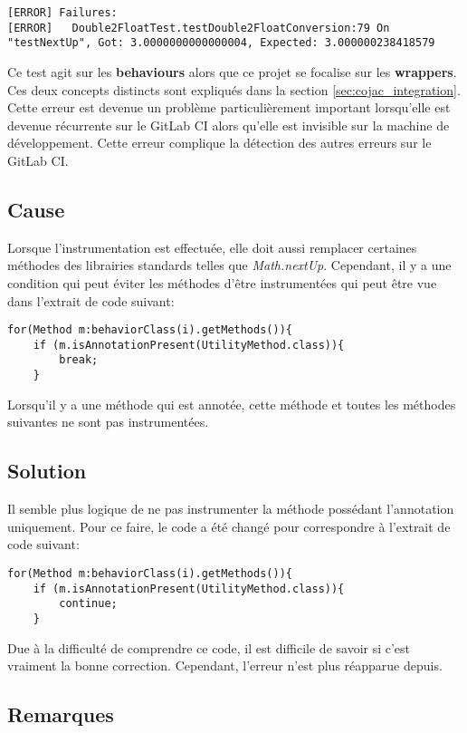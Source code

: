 \begin{verbatim}
[ERROR] Failures: 
[ERROR]   Double2FloatTest.testDouble2FloatConversion:79 On "testNextUp", Got: 3.0000000000000004, Expected: 3.000000238418579
\end{verbatim}

Ce test agit sur les \textbf{behaviours} alors que ce projet se focalise sur les \textbf{wrappers}. Ces deux concepts distincts sont expliqués dans la section \ref{sec:cojac_integration}. Cette erreur est devenue un problème particulièrement important lorsqu'elle est devenue récurrente sur le GitLab CI alors qu'elle est invisible sur la machine de développement. Cette erreur complique la détection des autres erreurs sur le GitLab CI.

\subsection{Cause}

Lorsque l'instrumentation est effectuée, elle doit aussi remplacer certaines méthodes des librairies standards telles que \textit{Math.nextUp}. Cependant, il y a une condition qui peut éviter les méthodes d'être instrumentées qui peut être vue dans l'extrait de code suivant:
\begin{verbatim}
for(Method m:behaviorClass(i).getMethods()){
    if (m.isAnnotationPresent(UtilityMethod.class)){
        break;
    }
\end{verbatim}
Lorsqu'il y a une méthode qui est annotée, cette méthode et toutes les méthodes suivantes ne sont pas instrumentées.

\subsection{Solution}

Il semble plus logique de ne pas instrumenter la méthode possédant l'annotation uniquement. Pour ce faire, le code a été changé pour correspondre à l'extrait de code suivant:
\begin{verbatim}
for(Method m:behaviorClass(i).getMethods()){
    if (m.isAnnotationPresent(UtilityMethod.class)){
        continue;
    }
\end{verbatim}

Due à la difficulté de comprendre ce code, il est difficile de savoir si c'est vraiment la bonne correction. Cependant, l'erreur n'est plus réapparue depuis.

\subsection{Remarques}

